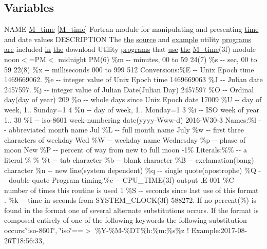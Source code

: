 \subsection*{Variables}
\begin{DoxyCompactItemize}
\item 
N\+A\+ME \hyperlink{M__time_83_8txt_a9591ef7ca68b7656bfd5560ed8d81293}{M\+\_\+time} \mbox{[}\hyperlink{M__time_83_8txt_a9591ef7ca68b7656bfd5560ed8d81293}{M\+\_\+time}\mbox{]} Fortran module for manipulating and presenting \hyperlink{M__stopwatch_83_8txt_a1091fdf3a4e66042d1571c7e4ade98dd}{time} and date values D\+E\+S\+C\+R\+I\+P\+T\+I\+ON The \hyperlink{M__stopwatch_83_8txt_a0f266597de2e57eb3aa964927bb30e14}{the} \hyperlink{ufpp__overview_81_8txt_a4d6669ece605d05985c83a04dd38e0ad}{source} and \hyperlink{option__stopwatch_83_8txt_a234fb06c9989676e2603991316e7ddc3}{example} utility \hyperlink{ufpp__overview_81_8txt_a14371501a41ff61714dd3fd8734de5a0}{programs} \hyperlink{M__stopwatch_83_8txt_a5040be02b832eba08820289c8a1f81c4}{are} included \hyperlink{M__journal_83_8txt_afce72651d1eed785a2132bee863b2f38}{in} \hyperlink{M__stopwatch_83_8txt_a0f266597de2e57eb3aa964927bb30e14}{the} download Utility \hyperlink{ufpp__overview_81_8txt_a14371501a41ff61714dd3fd8734de5a0}{programs} that \hyperlink{intro__blas1_83_8txt_a04fa2694d85f67a675bb3f45f7241f48}{use} \hyperlink{M__stopwatch_83_8txt_a0f266597de2e57eb3aa964927bb30e14}{the} \hyperlink{M__time_83_8txt_a9591ef7ca68b7656bfd5560ed8d81293}{M\+\_\+time}(3f) module noon$<$=\+P\+M$<$ midnight P\+M(6) \%m -\/-\/ minutes, 00 to 59 24(7) \%s -\/-\/ sec, 00 to 59 22(8) \%x -\/-\/ milliseconds 000 to 999 512 Conversions\+:\%\+E -\/-\/ Unix Epoch time 1469669062. \%e -\/-\/ integer value of Unix Epoch time 1469669063 \%\+J -\/-\/ Julian date 2457597. \%j -\/-\/ integer value of Julian Date(\+Julian Day) 2457597 \%\+O -\/-\/ Ordinal day(day of year) 209 \%o -\/-\/ whole days since Unix Epoch date 17009 \%\+U -\/-\/ day of week, 1.. Sunday=1 4 \%u -\/-\/ day of week, 1.. Monday=1 3 \%i -\/-\/ I\+S\+O week of year 1.. 30 \%\+I -\/-\/ iso-\/8601 week-\/numbering date(yyyy-\/\+Www-\/d) 2016-\/\+W30-\/3 Names\+:\%l -\/-\/ abbreviated month name Jul \%\+L -\/-\/ full month name July \%w -\/-\/ first three characters of weekday Wed \%\+W -\/-\/ weekday name Wednesday \%p -\/-\/ phase of moon New \%\+P -\/-\/ percent of way from new to full moon -\/1\% Literals\+:\%\% -\/-\/ a literal \% \% \%t -\/-\/ tab character \%b -\/-\/ blank character \%\+B -\/-\/ exclamation(bang) character \%n -\/-\/ new line(system dependent) \%q -\/-\/ single quote(apostrophe) \%\+Q -\/-\/ double quote Program timing\+:\%c -\/-\/ C\+P\+U\+\_\+\+T\+I\+M\+E(3f) output .\+E-\/001 \%\+C -\/-\/ number of times this routine is used 1 \%\+S -\/-\/ seconds since last use of this format . \%k -\/-\/ time in seconds from S\+Y\+S\+T\+E\+M\+\_\+\+C\+L\+O\+C\+K(3f) 588272. If no percent(\%) is found in the format one of several alternate substitutions occurs. If the format is composed entirely of one of the following keywords the following substitution occurs\+:\char`\"{}iso-\/8601\char`\"{}, \char`\"{}iso\char`\"{}==$>$ \%\+Y-\/\%\+M-\/\%\+D\+T\%h\+:\%m\+:\%s\%z ! Example\+:2017-\/08-\/26\+T18\+:56\+:33, 
\end{DoxyCompactItemize}
